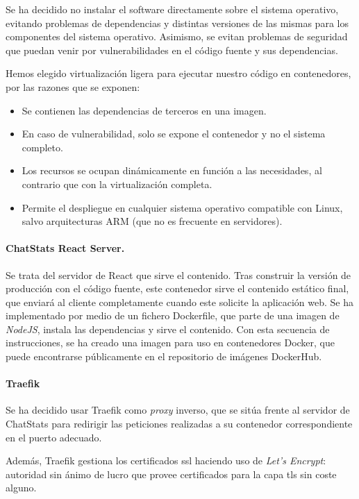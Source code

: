 Se ha decidido no instalar el software directamente sobre el sistema operativo, evitando problemas de dependencias y distintas versiones de las mismas para los componentes del sistema operativo. Asimismo, se evitan problemas de seguridad que puedan venir por vulnerabilidades en el código fuente y sus dependencias.

Hemos elegido virtualización ligera para ejecutar nuestro código en contenedores, por las razones que se exponen:

\begin{itemize}
	\item Se contienen las dependencias de terceros en una imagen.
	\item En caso de vulnerabilidad, solo se expone el contenedor y no el sistema completo.
	\item Los recursos se ocupan dinámicamente en función a las necesidades, al contrario que con la virtualización completa.
	\item Permite el despliegue en cualquier sistema operativo compatible con Linux, salvo arquitecturas ARM (que no es frecuente en servidores).
\end{itemize}

\paragraph{ChatStats React Server.} Se trata del servidor de React que sirve el contenido. Tras construir la versión de producción con el código fuente, este contenedor sirve el contenido estático final, que enviará al cliente completamente cuando este solicite la aplicación web. Se ha implementado por medio de un fichero Dockerfile, que parte de una imagen de \textit{NodeJS}, instala las dependencias y sirve el contenido. Con esta secuencia de instrucciones, se ha creado una imagen para uso en contenedores Docker, que puede encontrarse públicamente en el repositorio de imágenes DockerHub.

\paragraph{Traefik} Se ha decidido usar Traefik como \textit{proxy} inverso, que se sitúa frente al servidor de ChatStats para redirigir las peticiones realizadas a su contenedor correspondiente en el puerto adecuado.

Además, Traefik gestiona los certificados \acrshort{ssl} haciendo uso de \textit{Let's Encrypt}: autoridad sin ánimo de lucro que provee certificados para la capa \acrshort{tls} sin coste alguno.









